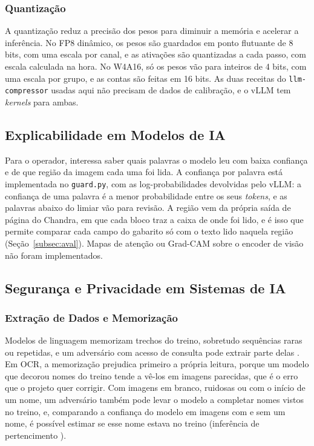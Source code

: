 \documentclass[12pt,a4paper]{article}
\begin{document}
\subsubsection{Quantização}
A quantização reduz a precisão dos pesos para diminuir a memória e acelerar a inferência. No FP8 dinâmico, os pesos são guardados em ponto flutuante de 8 bits, com uma escala por canal, e as ativações são quantizadas a cada passo, com escala calculada na hora. No W4A16, só os pesos vão para inteiros de 4 bits, com uma escala por grupo, e as contas são feitas em 16 bits. As duas receitas do \texttt{llm-compressor} \cite{llmcompressor} usadas aqui não precisam de dados de calibração, e o vLLM \cite{vllm2023} tem \emph{kernels} para ambas.

\subsection{Explicabilidade em Modelos de IA}

Para o operador, interessa saber quais palavras o modelo leu com baixa confiança e de que região da imagem cada uma foi lida. A confiança por palavra está implementada no \texttt{guard.py}, com as log-probabilidades devolvidas pelo vLLM: a confiança de uma palavra é a menor probabilidade entre os seus \emph{tokens}, e as palavras abaixo do limiar vão para revisão. A região vem da própria saída de página do Chandra, em que cada bloco traz a caixa de onde foi lido, e é isso que permite comparar cada campo do gabarito só com o texto lido naquela região (Seção~\ref{subsec:aval}). Mapas de atenção ou Grad-CAM \cite{gradcam2017} sobre o encoder de visão não foram implementados.

\subsection{Segurança e Privacidade em Sistemas de IA}

\subsubsection{Extração de Dados e Memorização}
Modelos de linguagem memorizam trechos do treino, sobretudo sequências raras ou repetidas, e um adversário com acesso de consulta pode extrair parte delas \cite{carlini2021extracting}. Em OCR, a memorização prejudica primeiro a própria leitura, porque um modelo que decorou nomes do treino tende a vê-los em imagens parecidas, que é o erro que o projeto quer corrigir. Com imagens em branco, ruidosas ou com o início de um nome, um adversário também pode levar o modelo a completar nomes vistos no treino, e, comparando a confiança do modelo em imagens com e sem um nome, é possível estimar se esse nome estava no treino (inferência de pertencimento \cite{shokri2017membership}).
\end{document}
